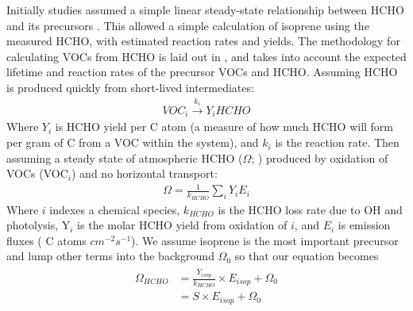     Initially studies assumed a simple linear steady-state relationship between HCHO and its precursors \parencite{Palmer2003, Palmer2006, Millet2006}.
    This allowed a simple calculation of isoprene using the measured HCHO, with estimated reaction rates and yields.
    The methodology for calculating VOCs from HCHO is laid out in \textcite{Palmer2003}, and takes into account the expected lifetime and reaction rates of the precursor VOCs and HCHO.
    Assuming HCHO is produced quickly from short-lived intermediates:
    \begin{eqnarray*}
      VOC_i \overset{k_i}{\rightarrow} Y_i HCHO
    \end{eqnarray*}
    Where $Y_i$ is HCHO yield per C atom (a measure of how much HCHO will form per gram of C from a VOC within the system), and $k_i$ is the reaction rate.
    Then assuming a steady state of atmospheric HCHO ($\Omega$; \moleccm) produced by oxidation of VOCs (VOC$_i$) and no horizontal transport:
    \begin{eqnarray*}
      \Omega = \frac{1}{k_{HCHO}} \sum_{i} Y_i E_i
    \end{eqnarray*}
    Where $i$ indexes a chemical species, $k_{HCHO}$ is the HCHO loss rate due to OH and photolysis, Y$_i$ is the molar HCHO yield from oxidation of $i$, and $E_i$ is emission fluxes ( C atoms $cm^{-2} s^{-1}$).
    We assume isoprene is the most important precursor and lump other terms into the background $\Omega_0$ so that our equation becomes 
    \begin{eqnarray} 
    \label{BioIsop:Method:slope:eqn_isop_to_hcho}
    \begin{split}
      \Omega_{HCHO} 
      &= \frac{Y_{isop}}{k_{HCHO}} \times E_{isop} + \Omega_0 \\
      & = S \times E_{isop} + \Omega_0
    \end{split} \end{eqnarray}
    
